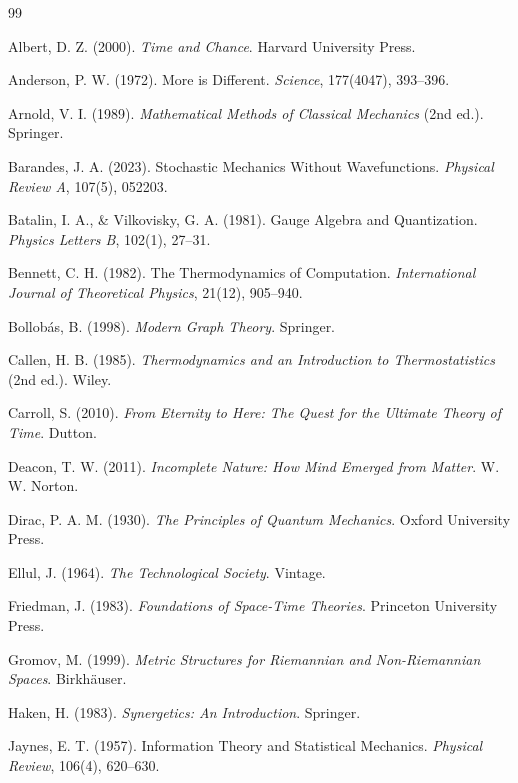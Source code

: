 \documentclass[12pt]{article}
\begin{document}
\newpage
\begin{thebibliography}{99}

Albert, D. Z. (2000).
\textit{Time and Chance}.
Harvard University Press.

Anderson, P. W. (1972).
More is Different.
\textit{Science}, 177(4047), 393--396.

Arnold, V. I. (1989).
\textit{Mathematical Methods of Classical Mechanics} (2nd ed.).
Springer.

Barandes, J. A. (2023).
Stochastic Mechanics Without Wavefunctions.
\textit{Physical Review A}, 107(5), 052203.

Batalin, I. A., \& Vilkovisky, G. A. (1981).
Gauge Algebra and Quantization.
\textit{Physics Letters B}, 102(1), 27--31.

Bennett, C. H. (1982).
The Thermodynamics of Computation.
\textit{International Journal of Theoretical Physics}, 21(12), 905--940.

Bollobás, B. (1998).
\textit{Modern Graph Theory}.
Springer.

Callen, H. B. (1985).
\textit{Thermodynamics and an Introduction to Thermostatistics} (2nd ed.).
Wiley.

Carroll, S. (2010).
\textit{From Eternity to Here: The Quest for the Ultimate Theory of Time}.
Dutton.

Deacon, T. W. (2011).
\textit{Incomplete Nature: How Mind Emerged from Matter}.
W. W. Norton.

Dirac, P. A. M. (1930).
\textit{The Principles of Quantum Mechanics}.
Oxford University Press.

Ellul, J. (1964).
\textit{The Technological Society}.
Vintage.

Friedman, J. (1983).
\textit{Foundations of Space-Time Theories}.
Princeton University Press.

Gromov, M. (1999).
\textit{Metric Structures for Riemannian and Non-Riemannian Spaces}.
Birkhäuser.

Haken, H. (1983).
\textit{Synergetics: An Introduction}.
Springer.

Jaynes, E. T. (1957).
Information Theory and Statistical Mechanics.
\textit{Physical Review}, 106(4), 620--630.


\end{thebibliography}
\end{document}
